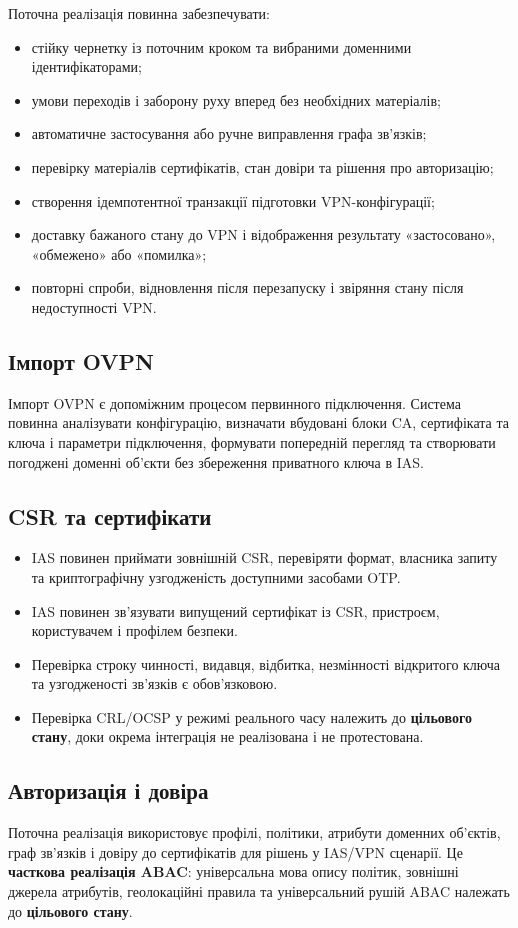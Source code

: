 \documentclass{article}
\begin{document}
Поточна реалізація повинна забезпечувати:
\begin{itemize}
  \item стійку чернетку із поточним кроком та вибраними доменними ідентифікаторами;
  \item умови переходів і заборону руху вперед без необхідних матеріалів;
  \item автоматичне застосування або ручне виправлення графа зв’язків;
  \item перевірку матеріалів сертифікатів, стан довіри та рішення про авторизацію;
  \item створення ідемпотентної транзакції підготовки VPN-конфігурації;
  \item доставку бажаного стану до VPN і відображення результату «застосовано», «обмежено» або «помилка»;
  \item повторні спроби, відновлення після перезапуску і звіряння стану після недоступності VPN.
\end{itemize}

\subsection{Імпорт OVPN}
Імпорт OVPN є допоміжним процесом первинного підключення. Система повинна аналізувати конфігурацію, визначати вбудовані блоки CA, сертифіката та ключа і параметри підключення, формувати попередній перегляд та створювати погоджені доменні об'єкти без збереження приватного ключа в IAS.

\subsection{CSR та сертифікати}
\begin{itemize}
  \item IAS повинен приймати зовнішній CSR, перевіряти формат, власника запиту та криптографічну узгодженість доступними засобами OTP.
  \item IAS повинен зв'язувати випущений сертифікат із CSR, пристроєм, користувачем і профілем безпеки.
  \item Перевірка строку чинності, видавця, відбитка, незмінності відкритого ключа та узгодженості зв’язків є обов'язковою.
  \item Перевірка CRL/OCSP у режимі реального часу належить до \textbf{цільового стану}, доки окрема інтеграція не реалізована і не протестована.
\end{itemize}

\subsection{Авторизація і довіра}
Поточна реалізація використовує профілі, політики, атрибути доменних об'єктів, граф зв’язків і довіру до сертифікатів для рішень у IAS/VPN сценарії. Це \textbf{часткова реалізація ABAC}: універсальна мова опису політик, зовнішні джерела атрибутів, геолокаційні правила та універсальний рушій ABAC належать до \textbf{цільового стану}.
\end{document}
